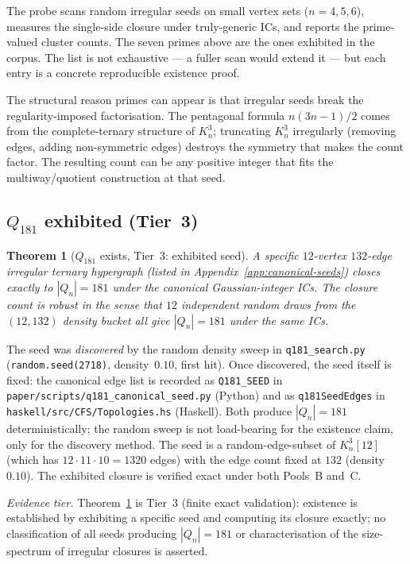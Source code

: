 \documentclass[12pt,a4paper]{article}
\newtheorem{theorem}{Theorem}[section]
\theoremstyle{definition}
\theoremstyle{remark}
\newcommand{\Kn}{K_n^3}
\newcommand{\Qn}{Q_n}
\begin{document}
The probe scans random irregular seeds on small vertex sets
($n = 4, 5, 6$), measures the single-side closure under truly-generic
ICs, and reports the prime-valued cluster counts. The seven primes
above are the ones exhibited in the corpus. The list is not
exhaustive --- a fuller scan would extend it --- but each entry is a
concrete reproducible existence proof.

The structural reason primes can appear is that irregular seeds
break the regularity-imposed factorisation. The pentagonal formula
$n(3n{-}1)/2$ comes from the complete-ternary structure of $\Kn$;
truncating $\Kn$ irregularly (removing edges, adding non-symmetric
edges) destroys the symmetry that makes the count factor. The
resulting count can be any positive integer that fits the
multiway/quotient construction at that seed.

\subsection{$Q_{181}$ exhibited (Tier~3)}\label{sec:primes-Q181}

\begin{theorem}[$Q_{181}$ exists, Tier~3: exhibited seed]\label{thm:Q181}
A specific $12$-vertex $132$-edge irregular ternary hypergraph (listed
in Appendix~\ref{app:canonical-seeds}) closes exactly to $|\Qn| = 181$
under the canonical Gaussian-integer ICs. The closure count is robust
in the sense that $12$ independent random draws from the $(12, 132)$
density bucket all give $|\Qn| = 181$ under the same ICs.
\end{theorem}

The seed was \emph{discovered} by the random density sweep in
\texttt{q181\_search.py} (\texttt{random.seed(2718)}, density~$0.10$,
first hit). Once discovered, the seed itself is fixed: the canonical
edge list is recorded as \texttt{Q181\_SEED} in
\texttt{paper/scripts/q181\_canonical\_seed.py} (Python) and as
\texttt{q181SeedEdges} in \texttt{haskell/src/CFS/Topologies.hs}
(Haskell). Both produce $|\Qn| = 181$ deterministically; the random
sweep is not load-bearing for the existence claim, only for the
discovery method. The seed is a random-edge-subset of $\Kn[12]$ (which
has $12 \cdot 11 \cdot 10 = 1320$ edges) with the edge count fixed at
$132$ (density $0.10$). The exhibited closure is verified exact under
both Pools~B and~C.

\emph{Evidence tier.} Theorem~\ref{thm:Q181} is Tier~3 (finite exact
validation): existence is established by exhibiting a specific seed
and computing its closure exactly; no classification of all seeds
producing $|\Qn| = 181$ or characterisation of the size-spectrum of
irregular closures is asserted.
\end{document}
